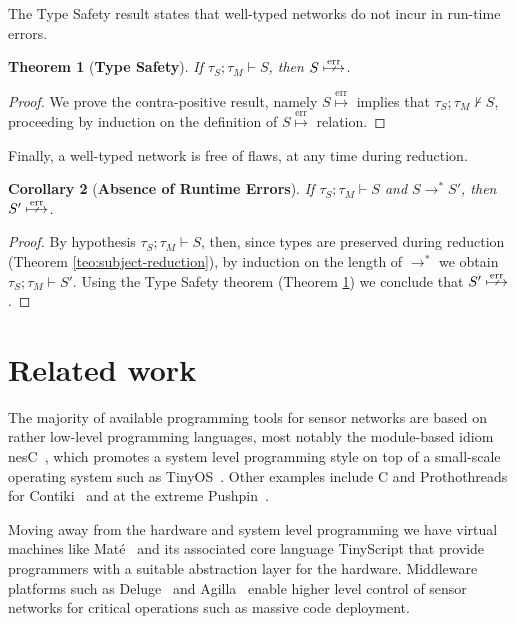 \documentclass[copyright,creativecommons]{eptcs}
\newcommand{\reduces}{\rightarrow}
\newcommand{\reducesn}{\reduces^{*}}
\newcommand{\err}{\overset{\text{err}}{\longmapsto}}
\newcommand{\type}{\vdash}
\newcommand{\nerr}{\overset{\text{err}}{\,\,\arrownot\!\!\longmapsto}}
\newtheorem{theorem}{Theorem}
\newtheorem{corollary}[theorem]{Corollary}
\begin{document}
The Type Safety result states that well-typed networks do not incur in
run-time errors.

\begin{theorem}[\bf Type Safety]
  \label{teo:type-safety}
  If $\tau_S;\tau_M \type S$, then $S \nerr$.
\end{theorem}

\begin{proof}
  We prove the contra-positive result, namely $S \err$ implies that
  $\tau_S;\tau_M \not \type S$, proceeding by induction on the
  definition of $S \err$ relation.
\end{proof}

Finally, a well-typed network is free of flaws, at any time during
reduction.

\begin{corollary}[\bf Absence of Runtime Errors]
  \label{cor:type-safety}
  If $\tau_S;\tau_M \type S$ and $S \reducesn S'$, then $S' \nerr$.
\end{corollary}

\begin{proof}
  By hypothesis $\tau_S;\tau_M \type S$, then, since types are
  preserved during reduction (Theorem \ref{teo:subject-reduction}), by
  induction on the length of $\reducesn$ we obtain $\tau_S;\tau_M
  \type S'$.
Using the Type Safety theorem (Theorem \ref{teo:type-safety}) we
  conclude that $S' \nerr$.
\end{proof}






\section{Related work}
\label{sec:related}

The majority of available programming tools for
sensor networks are based on rather low-level programming languages,
most notably the module-based idiom nesC~\cite{nesc:gay:levis:etal},
which promotes a system level programming style on top of a
small-scale operating system such as TinyOS~\cite{tinyos}. Other
examples include C and Prothothreads for Contiki~\cite{contiki} and at
the extreme Pushpin~\cite{pushpin}.

Moving away from the hardware and system level programming we have
virtual machines like Mat\'{e}~\cite{mate:levis:culler:02} and its
associated core language TinyScript that provide programmers with a
suitable abstraction layer for the hardware.
Middleware platforms such as Deluge~\cite{deluge:hui:culler:04} and
Agilla~\cite{agilla:fok:roman:lu:05} enable higher level control of
sensor networks for critical operations such as massive code
deployment.
\end{document}
